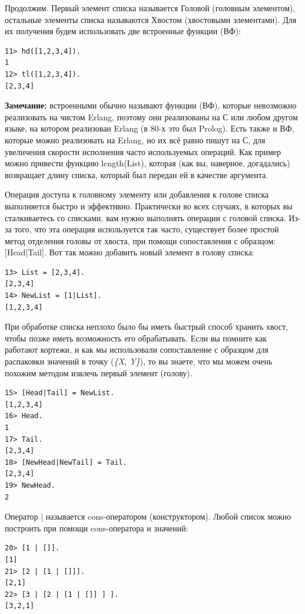 \documentclass[a4paper,12pt]{report}
\newcommand{\ops}{\colorbox{lgreen}}
\begin{document}
Продолжим. Первый элемент списка называется Головой (головным элементом), остальные элементы списка называются Хвостом (хвостовыми элементами). Для их получения будем использовать две встроенные функции (ВФ):
\begin{lstlisting}[style=repl]
11> hd([1,2,3,4]).
1
12> tl([1,2,3,4]).
[2,3,4]
\end{lstlisting}
\colorbox{lgray}
{
    \begin{minipage}{1.0\linewidth}
        \textbf{Замечание:} встроенными обычно называют функции (ВФ), которые невозможно реализовать на чистом Erlang, поэтому они реализованы на С или любом другом языке, на котором реализован Erlang (в 80\--х это был Prolog). Есть также и ВФ, которые можно реализовать на Erlang, но их всё равно пишут на С, для увеличения скорости исполнения часто используемых операций. Как пример можно привести функцию \ops{length(List)}, которая (как вы, наверное, догадались) возвращает длину списка, который был передан ей в качестве аргумента.
    \end{minipage}
}

Операция доступа к головному элементу или добавления к голове списка выполняется быстро и эффективно. Практически во всех случаях, в которых вы сталкиваетесь со списками, вам нужно выполнять операции с головой списка. Из\--за того, что эта операция используется так часто, существует более простой метод отделения головы от хвоста, при помощи сопоставления с образцом: \ops{[Head|Tail]}. Вот так можно добавить новый элемент в голову списка:
\begin{lstlisting}[style=repl]
13> List = [2,3,4].
[2,3,4]
14> NewList = [1|List].
[1,2,3,4]
\end{lstlisting}

При обработке списка неплохо было бы иметь быстрый способ хранить хвост, чтобы позже иметь возможность его обрабатывать. Если вы помните как работают кортежи, и как мы использовали сопоставление с образцом для распаковки значений в точку (\emph{\{X, Y\}}), то вы знаете, что мы можем очень похожим методом извлечь первый элемент (голову).
\begin{lstlisting}[style=repl]
15> [Head|Tail] = NewList.
[1,2,3,4]
16> Head.
1
17> Tail.
[2,3,4]
18> [NewHead|NewTail] = Tail.
[2,3,4]
19> NewHead.
2
\end{lstlisting}

Оператор \ops{|} называется cons\--оператором (конструктором). Любой список можно построить при помощи cons\--оператора и значений:
\begin{lstlisting}[style=repl]
20> [1 | []].
[1]
21> [2 | [1 | []]].
[2,1]
22> [3 | [2 | [1 | []] ] ].
[3,2,1]
\end{lstlisting}
\end{document}
